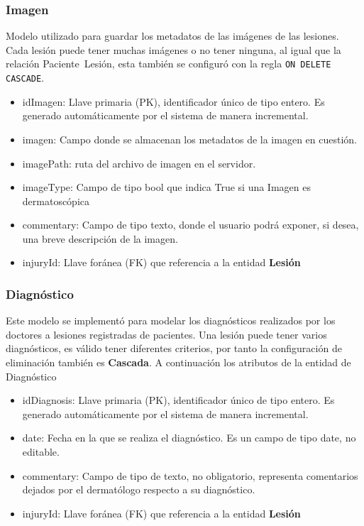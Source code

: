 \subsubsection{Imagen}
Modelo utilizado para guardar los metadatos\cite{metadato} de las im\'agenes de las lesiones.
Cada lesi\'on puede tener muchas im\'agenes o no tener ninguna, al igual que la relaci\'on Paciente~Lesi\'on,
esta tambi\'en se configur\'o con la regla \texttt{ON DELETE CASCADE}.
\begin{itemize}
    \item idImagen: Llave primaria (PK), identificador \'unico de tipo entero. Es generado autom\'aticamente por el sistema de manera incremental.
    \item imagen: Campo donde se almacenan los metadatos de la imagen en cuesti\'on.
    \item imagePath: ruta del archivo de imagen en el servidor.
    \item imageType: Campo de tipo bool que indica True si una Imagen es dermatosc\'opica
    \item commentary: Campo de tipo texto, donde el usuario podr\'a exponer, si desea, una breve descripci\'on de la imagen. 
    \item injuryId: Llave for\'anea (FK) que referencia a la entidad \textbf{Lesi\'on}
\end{itemize}

\subsubsection{Diagnóstico}
Este modelo se implement\'o para modelar los diagn\'osticos realizados por los doctores 
a lesiones registradas de pacientes. Una lesi\'on puede tener varios diagn\'osticos, 
es v\'alido tener diferentes criterios, por tanto la configuraci\'on de eliminaci\'on
tambi\'en es \textbf{Cascada}. A continuaci\'on los atributos de la entidad de Diagn\'ostico
\begin{itemize}
    \item idDiagnosis: Llave primaria (PK), identificador \'unico de tipo entero. Es generado autom\'aticamente por el sistema de manera incremental.
    \item date: Fecha en la que se realiza el diagn\'ostico. Es un campo de tipo date, no editable.
    \item commentary: Campo de tipo de texto, no obligatorio, representa comentarios dejados por el dermat\'ologo respecto a su diagn\'ostico.
    \item injuryId: Llave for\'anea (FK) que referencia a la entidad \textbf{Lesi\'on}
\end{itemize}

